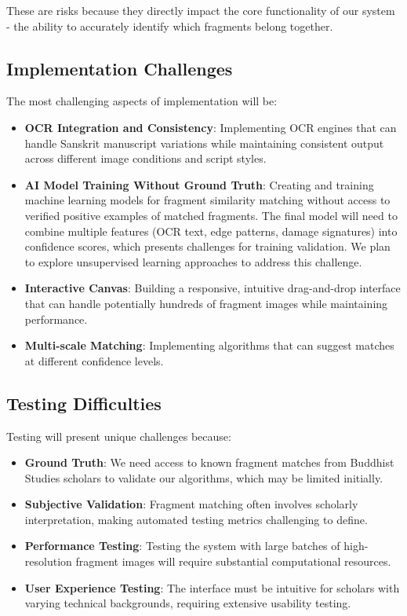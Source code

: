 \documentclass{article}
\begin{document}
These are risks because they directly impact the core functionality of our system - the ability to accurately identify which fragments belong together.

\subsection{Implementation Challenges}

The most challenging aspects of implementation will be:

\begin{itemize}
\item \textbf{OCR Integration and Consistency}: Implementing OCR engines that can handle Sanskrit manuscript variations while maintaining consistent output across different image conditions and script styles.
\item \textbf{AI Model Training Without Ground Truth}: Creating and training machine learning models for fragment similarity matching without access to verified positive examples of matched fragments. The final model will need to combine multiple features (OCR text, edge patterns, damage signatures) into confidence scores, which presents challenges for training validation. We plan to explore unsupervised learning approaches to address this challenge.
\item \textbf{Interactive Canvas}: Building a responsive, intuitive drag-and-drop interface that can handle potentially hundreds of fragment images while maintaining performance.
\item \textbf{Multi-scale Matching}: Implementing algorithms that can suggest matches at different confidence levels.
\end{itemize}

\subsection{Testing Difficulties}

Testing will present unique challenges because:

\begin{itemize}
\item \textbf{Ground Truth}: We need access to known fragment matches from Buddhist Studies scholars to validate our algorithms, which may be limited initially.
\item \textbf{Subjective Validation}: Fragment matching often involves scholarly interpretation, making automated testing metrics challenging to define.
\item \textbf{Performance Testing}: Testing the system with large batches of high-resolution fragment images will require substantial computational resources.
\item \textbf{User Experience Testing}: The interface must be intuitive for scholars with varying technical backgrounds, requiring extensive usability testing.
\end{itemize}
\end{document}
